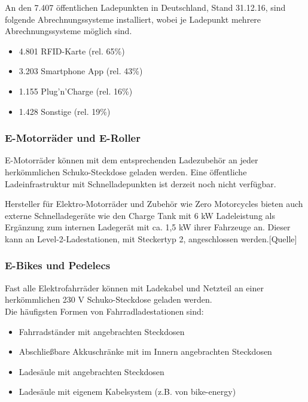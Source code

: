 				An den 7.407 öffentlichen Ladepunkten in Deutschland, Stand 31.12.16, sind folgende Abrechnungssysteme installiert, wobei je Ladepunkt mehrere Abrechnungssysteme möglich sind. \cite{BDEW_Anzahl_Ladepunkte} \\
				
				\begin{itemize}
					\item 4.801 RFID-Karte (rel. 65\%)
					\item 3.203 Smartphone App (rel. 43\%)
					\item 1.155 Plug'n'Charge (rel. 16\%)
					\item 1.428 Sonstige (rel. 19\%)
				\end{itemize}
			
			\subsubsection{E-Motorräder und E-Roller}
				E-Motorräder können mit dem entsprechenden Ladezubehör an jeder herkömmlichen Schuko-Steckdose geladen werden. Eine öffentliche Ladeinfrastruktur mit Schnelladepunkten ist derzeit noch nicht verfügbar.
				
				Hersteller für Elektro-Motorräder und Zubehör wie Zero Motorcycles bieten auch externe Schnelladegeräte wie den Charge Tank mit 6 kW Ladeleistung als Ergänzung zum internen Ladegerät mit ca. 1,5 kW ihrer Fahrzeuge an. Dieser kann an Level-2-Ladestationen, mit Steckertyp 2, angeschlossen werden.[Quelle] 
			
			
			
			\subsubsection{E-Bikes und Pedelecs}
				Fast alle Elektrofahrräder können mit Ladekabel und Netzteil an einer herkömmlichen 230 V Schuko-Steckdose geladen werden.\\
				
				Die häufigsten Formen von Fahrradladestationen sind:
				\begin{itemize}
					\item Fahrradständer mit angebrachten Steckdosen
					\item Abschließbare Akkuschränke mit im Innern angebrachten Steckdosen
					\item Ladesäule mit angebrachten Steckdosen 
					\item Ladesäule mit eigenem Kabelsystem (z.B. von bike-energy)
				\end{itemize}
				
